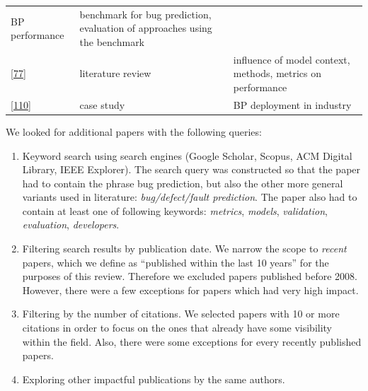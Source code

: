 \documentclass[]{book}
\begin{document}
\begin{longtable}[]{@{}lll@{}}
\begin{minipage}[t]{0.18\columnwidth}
BP performance\strut
\end{minipage} & \begin{minipage}[t]{0.50\columnwidth}\raggedright\strut
benchmark for bug prediction, evaluation of approaches using the
benchmark\strut
\end{minipage}\tabularnewline
\begin{minipage}[t]{0.23\columnwidth}\raggedright\strut
{[}\protect\hyperlink{ref-Hall2012}{77}{]}\strut
\end{minipage} & \begin{minipage}[t]{0.18\columnwidth}\raggedright\strut
literature review\strut
\end{minipage} & \begin{minipage}[t]{0.50\columnwidth}\raggedright\strut
influence of model context, methods, metrics on performance\strut
\end{minipage}\tabularnewline
\begin{minipage}[t]{0.23\columnwidth}\raggedright\strut
{[}\protect\hyperlink{ref-Lewis2013}{110}{]}\strut
\end{minipage} & \begin{minipage}[t]{0.18\columnwidth}\raggedright\strut
case study\strut
\end{minipage} & \begin{minipage}[t]{0.50\columnwidth}\raggedright\strut
BP deployment in industry\strut
\end{minipage}\tabularnewline
\bottomrule
\end{longtable}

We looked for additional papers with the following queries:

\begin{enumerate}
\def\labelenumi{\arabic{enumi}.}
\item
  Keyword search using search engines (Google Scholar, Scopus, ACM
  Digital Library, IEEE Explorer). The search query was constructed so
  that the paper had to contain the phrase bug prediction, but also the
  other more general variants used in literature: \emph{bug/defect/fault
  prediction}. The paper also had to contain at least one of following
  keywords: \emph{metrics}, \emph{models}, \emph{validation},
  \emph{evaluation}, \emph{developers}.
\item
  Filtering search results by publication date. We narrow the scope to
  \emph{recent} papers, which we define as ``published within the last
  10 years'' for the purposes of this review. Therefore we excluded
  papers published before 2008. However, there were a few exceptions for
  papers which had very high impact.
\item
  Filtering by the number of citations. We selected papers with 10 or
  more citations in order to focus on the ones that already have some
  visibility within the field. Also, there were some exceptions for
  every recently published papers.
\item
  Exploring other impactful publications by the same authors.
\end{enumerate}
\end{document}
